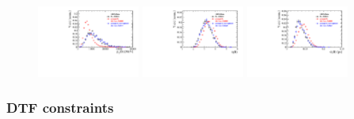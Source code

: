 \begin{figure}[h]
\centering
\includegraphics[height=!,width=0.3\textwidth]{figs/dataVsMC/LTU/combined/Ds2all_2_Bs_PT.pdf}
\includegraphics[height=!,width=0.3\textwidth]{figs/dataVsMC/LTU/combined/Ds2all_2_Bs_ETA.pdf}
\includegraphics[height=!,width=0.3\textwidth]{figs/dataVsMC/LTU/combined/Ds2all_2_Bs_DTF_TAUERR.pdf}
\caption{}
\label{fig:}
\end{figure}

\subsubsection{DTF constraints}
